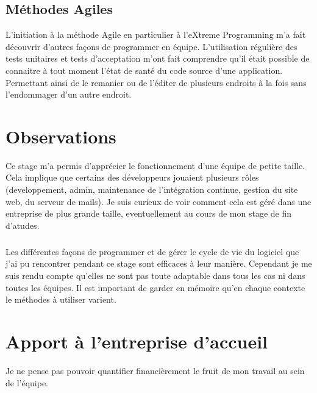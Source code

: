 \subsection{Méthodes Agiles}
L'initiation à la méthode Agile en particulier à l'eXtreme Programming m'a fait découvrir d'autres façons de programmer en équipe. L'utilisation régulière des tests unitaires et tests d'acceptation m'ont fait comprendre qu'il était possible de connaitre à tout moment l'état de santé du code source d'une application. Permettant ainsi de le remanier ou de l'éditer de plusieurs endroits à la fois sans l'endommager d'un autre endroit.

\section{Observations}
Ce stage m'a permis d'apprécier le fonctionnement d'une équipe de petite taille. Cela implique que certains des développeurs jouaient plusieurs rôles (developpement, admin, maintenance de l'intégration continue, gestion du site web, du serveur de mails). Je suis curieux de voir comment cela est géré dans une entreprise de plus grande taille, eventuellement au cours de mon stage de fin d'atudes.
\subparagraph*{}
Les différentes façons de programmer et de gérer le cycle de vie du logiciel que j'ai pu rencontrer pendant ce stage sont efficaces à leur manière. Cependant je me suis rendu compte qu'elles ne sont pas toute adaptable dans tous les cas ni dans toutes les équipes. Il est important de garder en mémoire qu'en chaque contexte le méthodes à utiliser varient.

\section{Apport à l'entreprise d'accueil}
Je ne pense pas pouvoir quantifier financièrement le fruit de mon travail au sein de l'équipe.